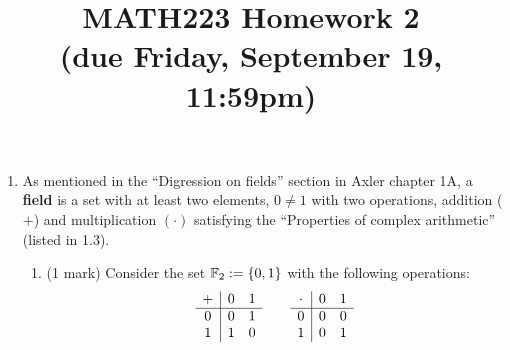 \documentclass[12pt]{article}
\begin{document}
\title{MATH223 Homework 2\\ (due Friday, September 19, 11:59pm)}
\author{}
\date{}
\maketitle
{}

\begin{enumerate}
\item As mentioned in the ``Digression on fields'' section in Axler chapter 1A, a \textbf{field} is a set with at least two elements, $0\neq 1$ with two operations, addition ($+$) and multiplication $(\cdot)$ satisfying the ``Properties of complex arithmetic'' (listed in 1.3).
  \begin{enumerate}
  \item (1 mark) Consider the set $\mathbb{F}_2:=\{0,1\}$ with the following operations:
    \[
      \begin{array}[h]{c | c c}
        + & 0 & 1 \\
        \hline
        0 & 0 & 1 \\
        1 & 1 & 0
      \end{array}
      \qquad
      \begin{array}[h]{c | c c}
        \cdot & 0 & 1 \\
        \hline
        0 & 0 & 0 \\
        1 & 0 & 1
      \end{array}
    \]


\end{enumerate}
\end{enumerate}
\end{document}

